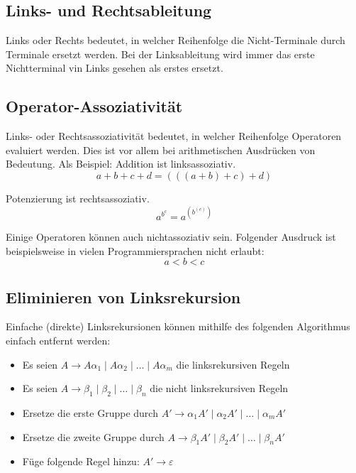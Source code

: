 

\subsection{Links- und Rechtsableitung}

Links oder Rechts bedeutet, in welcher Reihenfolge die Nicht-Terminale durch
Terminale ersetzt werden. Bei der Linksableitung wird immer das erste
Nichtterminal vin Links gesehen als erstes ersetzt.


\subsection{Operator-Assoziativität}

Links- oder Rechtsassoziativität bedeutet, in welcher Reihenfolge Operatoren
evaluiert werden.  Dies ist vor allem bei arithmetischen Ausdrücken von
Bedeutung. Als Beispiel: Addition ist linksassoziativ.
\[
	a + b + c + d = (((a + b) + c) + d)
\]

Potenzierung ist rechtsassoziativ.
\[
	a^{b^c} = a^{(b^{(c)})}
\]

Einige Operatoren können auch nichtassoziativ sein. Folgender Ausdruck ist
beispielsweise in vielen Programmiersprachen nicht erlaubt:
\[
	a < b < c
\]


\subsection{Eliminieren von Linksrekursion}

Einfache (direkte) Linksrekursionen können mithilfe des folgenden Algorithmus einfach entfernt
werden:

\begin{itemize}
	\item Es seien $A \rightarrow A\alpha_1 \mid A\alpha_2 \mid \ldots \mid A\alpha_m$ die
		linksrekursiven Regeln
	\item Es seien $A \rightarrow \beta_1 \mid \beta_2 \mid \ldots \mid \beta_n$ die nicht
		linksrekursiven Regeln
	\item Ersetze die erste Gruppe durch $A' \rightarrow \alpha_1A'\mid \alpha_2A' \mid \ldots \mid
		\alpha_mA'$
	\item Ersetze die zweite Gruppe durch $A \rightarrow \beta_1A' \mid \beta_2A' \mid \ldots \mid
		\beta_nA'$
	\item Füge folgende Regel hinzu: $A' \rightarrow \varepsilon$
\end{itemize}


